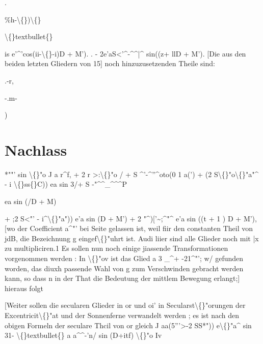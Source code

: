 \documentclass[10pt,a4paper]{article}
\begin{document}
.

\%h-\textbackslash\{\})\textbackslash\{\}

\textbackslash\{\}textbullet\{\}

is e'\textasciicircum{}'cos(ii-\textbackslash\{\}-i)D + M'). . - 2e'aS<'\textasciicircum{}-\textasciicircum{}\textasciicircum{}|\textasciicircum{} sin((z+ llD + M').
[Die aus den beiden letzten Gliedern von 15] noch hinzuzusetzenden
Theile sind:

.-r,

-.m-

)

\newpage

\section*{Nachlass}

*""' sin \textbackslash\{\}"o J
a r\textasciicircum{}f, + 2 r >:\textbackslash\{\}"o / + S \textasciicircum{}'-\textasciicircum{}''\textasciicircum{}oto(0
1 a(')
+ (2 S\textbackslash\{\}"o\textbackslash\{\}"a"\textasciicircum{} - i \textbackslash\{\}ss\{\}C)) ea sin 3/+ S -"\textasciicircum{}\textasciicircum{}\_\textasciicircum{}\textasciicircum{}\textasciicircum{}P

ea sin (/D + M)

+ ;2 S<"' - i\textasciicircum{}\textbackslash\{\}"a")) e'a sin (D + M') + 2 "\textasciicircum{})['\textasciitilde{};\textasciicircum{}"\textasciicircum{} e'a sin ((t + 1 ) D + M'),
[wo der Coefficient a\textasciicircum{}"' bei Seite gelassen ist, weil fiir den constanten Theil
von jdB, die Bezeichnung g eingef\textbackslash\{\}"uhrt ist. Audi liier sind alle Glieder noch
mit |x zu multipliciren.1
Es sollen nun noch einige jiassende Transformationen vorgenommen
werden :
In \textbackslash\{\}"ov ist das Glied a 3 \_\textasciicircum{}+ -21\textasciicircum{}"'; w/ gefunden worden, das diuxh passende
Wahl von g zum Verschwinden gebracht werden kann, so dass n in der That
die Bedeutung der mittlem Bewegung erlangt;] hieraus folgt

[Weiter sollen die secularen Glieder in or und oi' in Secularst\textbackslash\{\}"orungen
der Excentricit\textbackslash\{\}"at und der Sonnenferne verwandelt werden ; es ist nach den
obigen Formeln
der seculare Thcil von or gleich J aa(5'''>-2 SS*")) e\textbackslash\{\}"a\textasciicircum{} sin 31- \textbackslash\{\}textbullet\{\} a a\textasciicircum{}\textasciicircum{}-'n/ sin (D+itf)
\textbackslash\{\}"o Iv
\end{document}
